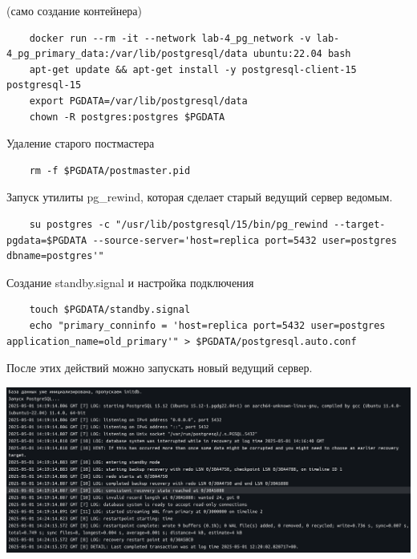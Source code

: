 \documentclass{article}
\begin{document}
(само создание контейнера)
\begin{lstlisting}
    docker run --rm -it --network lab-4_pg_network -v lab-4_pg_primary_data:/var/lib/postgresql/data ubuntu:22.04 bash
    apt-get update && apt-get install -y postgresql-client-15 postgresql-15
    export PGDATA=/var/lib/postgresql/data
    chown -R postgres:postgres $PGDATA
\end{lstlisting}
Удаление старого постмастера
\begin{lstlisting}
    rm -f $PGDATA/postmaster.pid
\end{lstlisting}
Запуск утилиты pg\_rewind, которая сделает старый ведущий сервер ведомым.
\begin{lstlisting}
    su postgres -c "/usr/lib/postgresql/15/bin/pg_rewind --target-pgdata=$PGDATA --source-server='host=replica port=5432 user=postgres dbname=postgres'"
\end{lstlisting}
Создание standby.signal и настройка подключения
\begin{lstlisting}
    touch $PGDATA/standby.signal
    echo "primary_conninfo = 'host=replica port=5432 user=postgres application_name=old_primary'" > $PGDATA/postgresql.auto.conf
\end{lstlisting}
После этих действий можно запускать новый ведущий сервер.
\begin{center}
    \includegraphics[width=.9\textwidth]{new-replica-logs.png}
\end{center}
\end{document}
